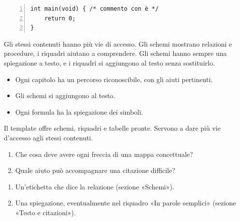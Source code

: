 \begin{lstlisting}[numbers=left]
int main(void) { /* commento con è */
    return 0;
}
\end{lstlisting}

\begin{mappafine}
\centering
{}
\end{mappafine}

Gli stessi contenuti hanno più vie di accesso. Gli schemi mostrano relazioni e procedure, i riquadri aiutano a comprendere. Gli schemi hanno sempre una spiegazione a testo, e i riquadri si aggiungono al testo senza sostituirlo.

\begin{daricordare}
\begin{itemize}
\item Ogni capitolo ha un percorso riconoscibile, con gli aiuti pertinenti.
\item Gli schemi si aggiungono al testo.
\item Ogni formula ha la spiegazione dei simboli.
\end{itemize}
\end{daricordare}

\begin{insintesi}
Il template offre schemi, riquadri e tabelle pronte. Servono a dare più vie d'accesso agli stessi contenuti.
\end{insintesi}

\begin{ripasso}
\begin{enumerate}
\item Che cosa deve avere ogni freccia di una mappa concettuale?
\item Quale aiuto può accompagnare una citazione difficile?
\end{enumerate}
\end{ripasso}

\begin{risposte}
\begin{enumerate}
\item Un'etichetta che dice la relazione (sezione «Schemi»).
\item Una spiegazione, eventualmente nel riquadro «In parole semplici» (sezione «Testo e citazioni»).
\end{enumerate}
\end{risposte}
